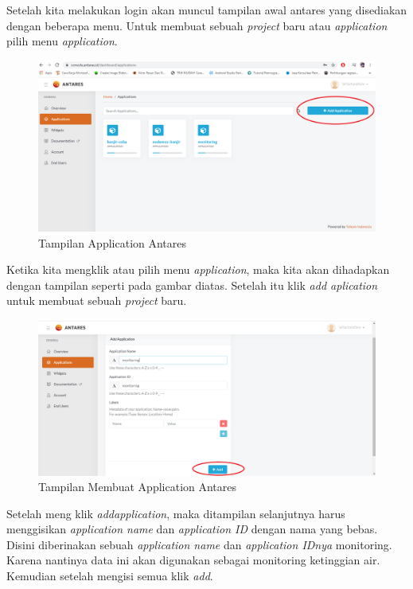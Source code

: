 \begin{enumerate}
    \par Setelah kita melakukan login akan muncul tampilan awal antares yang disediakan dengan beberapa menu. Untuk membuat sebuah \textit{project} baru atau \textit{application} pilih menu \textit{application}.
    \begin{figure}[H]
    \centering
    \includegraphics[width=1\textwidth]{figures/project2.png}
    \caption{Tampilan Application  Antares}
    \label{print}
    \end{figure}
    
    \par Ketika kita mengklik atau pilih menu \textit{application}, maka kita akan dihadapkan dengan tampilan seperti pada gambar diatas. Setelah itu klik \textit{add aplication} untuk membuat sebuah \textit{project} baru.
     \begin{figure}[H]
    \centering
    \includegraphics[width=1\textwidth]{figures/project3.png}
    \caption{Tampilan Membuat Application  Antares}
    \label{print}
    \end{figure}
    
    \par Setelah meng klik \textit{addapplication}, maka ditampilan selanjutnya harus menggisikan \textit{application name} dan \textit{application ID} dengan nama yang bebas. Disini diberinakan sebuah \textit{application name} dan \textit{application IDnya} monitoring. Karena nantinya data ini akan digunakan sebagai monitoring ketinggian air. Kemudian setelah mengisi semua klik \textit{add}.
    

\end{enumerate}
